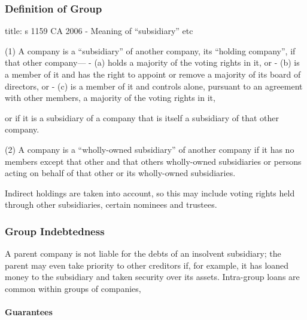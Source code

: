 \documentclass[
]{article}
\newenvironment{Shaded}{}{}
\newcommand{\NormalTok}[1]{#1}
\begin{document}
\hypertarget{definition-of-group}{%
\subsubsection{Definition of Group}\label{definition-of-group}}

\begin{Shaded}
\begin{Highlighting}[]
\NormalTok{title: s 1159 CA 2006 {-} Meaning of “subsidiary” etc}

\NormalTok{(1) A company is a “subsidiary” of another company, its “holding company”, if that other company—}
\NormalTok{{-} (a) holds a majority of the voting rights in it, or}
\NormalTok{{-} (b) is a member of it and has the right to appoint or remove a majority of its board of directors, or}
\NormalTok{{-} (c) is a member of it and controls alone, pursuant to an agreement with other members, a majority of the voting rights in it,}

\NormalTok{or if it is a subsidiary of a company that is itself a subsidiary of that other company.}

\NormalTok{(2) A company is a “wholly{-}owned subsidiary” of another company if it has no members except that other and that other\textquotesingle{}s wholly{-}owned subsidiaries or persons acting on behalf of that other or its wholly{-}owned subsidiaries.}
\end{Highlighting}
\end{Shaded}

Indirect holdings are taken into account, so this may include voting
rights held through other subsidiaries, certain nominees and trustees.

\hypertarget{group-indebtedness}{%
\subsubsection{Group Indebtedness}\label{group-indebtedness}}

A parent company is not liable for the debts of an insolvent subsidiary;
the parent may even take priority to other creditors if, for example, it
has loaned money to the subsidiary and taken security over its assets.
Intra-group loans are common within groups of companies,

\hypertarget{guarantees}{%
\paragraph{Guarantees}\label{guarantees}}
\end{document}
